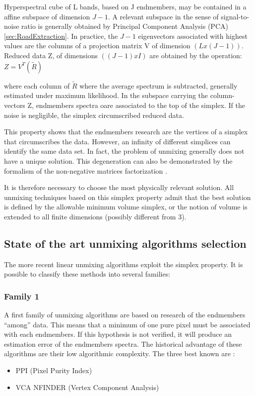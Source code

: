 Hyperspectral cube of L bands, based on J endmembers,
may be contained in a affine subspace of dimension $J-1$.
A relevant subspace in the sense of signal-to-noise ratio is
generally obtained by Principal Component Analysis (PCA) \ref{sec:RoadExtraction}. 
In practice, the $J-1$ eigenvectors associated with highest values are
the columns of a projection matrix V of dimension $(Lx(J-1))$. Reduced
data Z, of dimensions $((J-1)xI)$ are obtained by the operation:
$Z=V^{T}(\tilde{R})$

where each column of $\tilde{R}$ where the average spectrum is subtracted,
generally estimated under maximum likelihood. In the
subspace carrying the column-vectors Z, endmembers spectra oare associated to the top of the simplex. If the noise is
negligible, the simplex circumscribed reduced data.

This property shows that the endmembers research are the vertices of a
simplex that circumscribes the data. However, an infinity of different
simplices can identify the same data set. In fact, the problem of
unmixing generally does not have a unique solution. This degeneration can also be
demonstrated by the formalism of the non-negative
matrices factorization \cite{Huck2010a}.

It is therefore necessary to choose the most physically
relevant solution. All unmixing techniques based on this simplex property admit that the best solution is defined by the allowable
minimum volume simplex, or the notion of volume is extended to all
finite dimensions (possibly different from 3).
  

\subsection{State of the art unmixing algorithms selection} 
The more recent linear unmixing algorithms exploit the
simplex property. It is possible to classify these methods into several families:

\subsubsection{Family 1} 
A first family of unmixing algorithms are based on research of the
endmembers ``among'' data. This means that a minimum of one pure pixel must
be associated with each endmembers. If this hypothesis is not
verified, it will produce an estimation error of the endmembers spectra. The historical advantage of these algorithms are their low
algorithmic complexity. The three best known are :
\begin{itemize}
\item PPI (Pixel Purity Index)
\item VCA NFINDER (Vertex Component Analysis) \cite{Nascimento2005}
\end{itemize}


